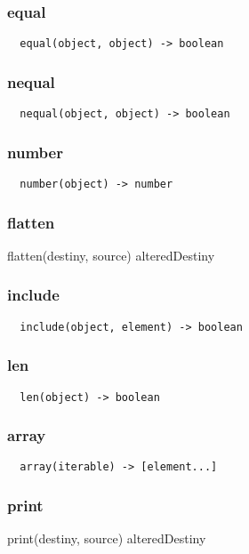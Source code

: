 \subsubsection*{equal}
\begin{verbatim}
  equal(object, object) -> boolean
\end{verbatim}

\subsubsection*{nequal}
\begin{verbatim}
  nequal(object, object) -> boolean
\end{verbatim}

\subsubsection*{number}
\begin{verbatim}
  number(object) -> number
\end{verbatim}

\subsubsection*{flatten}
flatten(destiny, source) \rightarrow alteredDestiny

\subsubsection*{include}
\begin{verbatim}
  include(object, element) -> boolean
\end{verbatim}

\subsubsection*{len}
\begin{verbatim}
  len(object) -> boolean
\end{verbatim}

\subsubsection*{array}
\begin{verbatim}
  array(iterable) -> [element...]
\end{verbatim}

\subsubsection*{print}
print(destiny, source) \rightarrow alteredDestiny

